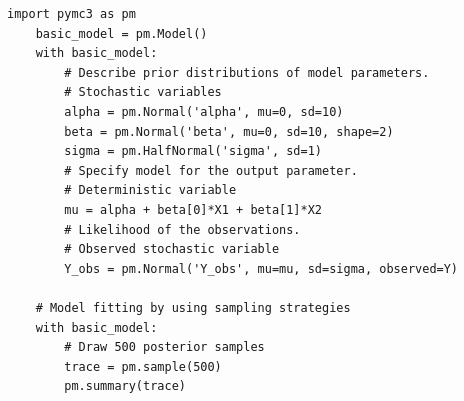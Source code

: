 \documentclass{article}
\begin{document}
\begin{lstlisting}[caption={Example code of a simple Bayesian model using PyMC3}, label={list:pymc3_example_code},captionpos=b]
    import pymc3 as pm
    basic_model = pm.Model()
    with basic_model:
        # Describe prior distributions of model parameters. 
        # Stochastic variables
        alpha = pm.Normal('alpha', mu=0, sd=10)
        beta = pm.Normal('beta', mu=0, sd=10, shape=2)
        sigma = pm.HalfNormal('sigma', sd=1)
        # Specify model for the output parameter. 
        # Deterministic variable
        mu = alpha + beta[0]*X1 + beta[1]*X2
        # Likelihood of the observations. 
        # Observed stochastic variable
        Y_obs = pm.Normal('Y_obs', mu=mu, sd=sigma, observed=Y)
	
    # Model fitting by using sampling strategies   
    with basic_model:
        # Draw 500 posterior samples
        trace = pm.sample(500)
        pm.summary(trace)
\end{lstlisting}




\end{document}
